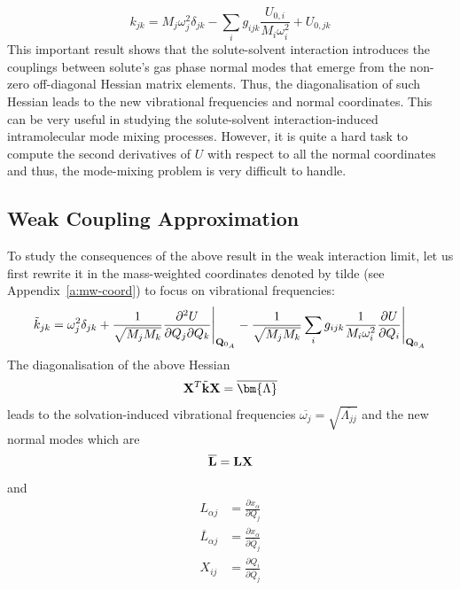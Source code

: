 \documentclass[a4paper,titlepage,twoside,fleqn,12pt]{book}
\newcommand{\BM}[1]{\bm{#1}}
\newcommand{\fderiv}[2]{\ensuremath{
    \frac{\partial #1}{\partial #2}}}
\newcommand{\sderivd}[3]{\ensuremath{
    \frac{\partial^2 #1}{\partial #2 \partial #3}
    }}
\begin{document}
\begin{refsection}
\begin{equation}
\boxed{
 k_{jk} = M_j \omega_j^2 \delta_{jk} - \sum_i g_{ijk} \frac{U_{0,i}}{M_i\omega_i^2} + U_{0,jk}
}
\end{equation}
%
This important result shows that the solute\hyp{}solvent interaction
introduces the couplings between solute's gas phase
normal modes that emerge from the non\hyp{}zero off\hyp{}diagonal
Hessian matrix elements. Thus, the diagonalisation of such
Hessian leads to the new vibrational frequencies and normal
coordinates. This can be very useful in studying the solute\hyp{}solvent 
interaction\hyp{}induced intramolecular mode
mixing processes. However, it is quite a hard task to 
compute the second derivatives of $U$
with respect to all the normal coordinates and thus, the mode\hyp{}mixing
problem is very difficult to handle. 

\subsection{Weak Coupling Approximation\label{s:wca}}

To study the consequences of the above result in the weak interaction
limit, let us first rewrite it
in the mass\hyp{}weighted
coordinates denoted by tilde (see Appendix~\ref{a:mw-coord}) to focus on vibrational
frequencies:
%
\begin{equation} 
 \tilde{k}_{jk} = \omega_j^2 \delta_{jk} + \frac{1}{\sqrt{M_jM_k}}\sderivd{U}{Q_j}{Q_k}  \Bigg|_{{\bf Q}_{0_A}} 
                           - \frac{1}{\sqrt{M_jM_k}}\sum_i g_{ijk} 
                             \frac{1}{M_i\omega_i^2}\fderiv{U}{Q_i}          \Bigg|_{{\bf Q}_{0_A}}        
\end{equation}
%
The diagonalisation of the above Hessian
%
\begin{equation} 
 {\bf X}^T \tilde{\bf k} {\bf X} = \overline{\BM\Lambda}
\end{equation}
%
leads to the solvation\hyp{}induced vibrational frequencies
$\overline{\omega_j}=\sqrt{\overline{\Lambda_{jj}}}$ 
and the new normal modes which are
%
\begin{equation} 
 \overline{\bf L}  = {\bf L} {\bf X}
\end{equation}
%
and
%
\begin{subequations} \label{eq:L-matrices}
 \begin{align}
            {L}_{\alpha j}  &= \fderiv{x_\alpha}{         {Q}_j} \\
   \overline{L}_{\alpha j}  &= \fderiv{x_\alpha}{\overline{Q}_j} \\
                  X_{ij}    &= \fderiv{Q_i}{\overline{Q}_j}
 \end{align}
\end{subequations}
%


\end{refsection}
\end{document}
